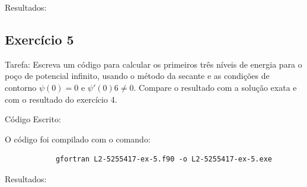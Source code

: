 \documentclass[12pt, a4paper]{article} %
\begin{document}
        Resultados:

    

    \subsection{Exerc\'icio 5}

        Tarefa: Escreva um c\'odigo para calcular os primeiros tr\^es n\'iveis de energia para o po\c{c}o de potencial inﬁnito, usando o m\'etodo da secante e as condi\c{c}\~oes de contorno $\psi(0) = 0$ e
        $\psi '(0) 6 \neq  0$. Compare o resultado com a solu\c{c}\~ao exata e com o resultado do exerc\'icio 4.

        C\'odigo Escrito:
        

        O c\'odigo foi compilado com o comando:
        \begin{verbatim}
            gfortran L2-5255417-ex-5.f90 -o L2-5255417-ex-5.exe
        \end{verbatim}

        Resultados:
        
\end{document}
